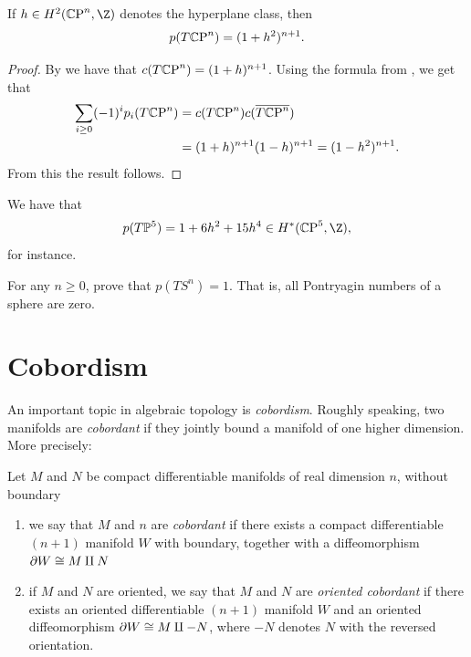 \documentclass[11pt]{book}
\begin{document}
\begin{theorem}
\label{thm:pontryagin-numbers-cpn} 
If $h \in H^2(\CP^n,\Z)$ denotes the hyperplane class, then
\begin{align*}
    p(T{\mathbb{C}\text{P}}^n) = (1+h^2)^{n+1}.
\end{align*}
\end{theorem}
\begin{proof} By  we have that $c(T{\mathbb{C}\text{P}}^n) = (1+h)^{n+1}$. Using the formula from , we get that
\begin{align*}
    \sum_{i\ge0} (-1)^i p_i(T{\mathbb{C}\text{P}}^n) &= c(T {\mathbb{C}\text{P}}^n) c(\overline{T{\mathbb{C}\text{P}}^n}) \\
    &= (1+h)^{n+1}(1-h)^{n+1} = (1-h^2)^{n+1}.
\end{align*}
From this the result follows.
\end{proof}

\begin{example} We have that
\begin{align*}
    p(T \mathbb{P}^5) = 1 + 6h^2 + 15h^4 \in H^\ast(\CP^5,\Z),
\end{align*}
for instance.
\end{example}

\begin{exercise} For any $n\ge0$, prove that $p(TS^n)=1$. That is, all Pontryagin numbers of a sphere are zero.
\end{exercise}





\section{Cobordism}

An important topic in algebraic topology is \emph{cobordism}. Roughly speaking, two manifolds are \emph{cobordant} if they jointly bound a manifold of one higher dimension. More precisely:

\begin{definition}\label{def:cobordism} Let $M$ and $N$ be compact differentiable manifolds of real dimension $n$, without boundary
\begin{enumerate}
    \item we say that $M$ and $n$ are \emph{cobordant} if there exists a compact differentiable $(n+1)$ manifold $W$ with boundary, together with a diffeomorphism $\partial W \cong M \amalg N$
    \item if $M$ and $N$ are oriented, we say that $M$ and $N$ are \emph{oriented cobordant} if there exists an oriented differentiable $(n+1)$ manifold $W$ and an oriented diffeomorphism $\partial W \cong M \amalg -N$, where $-N$ denotes $N$ with the reversed orientation.
\end{enumerate}
\end{definition}
\end{document}
